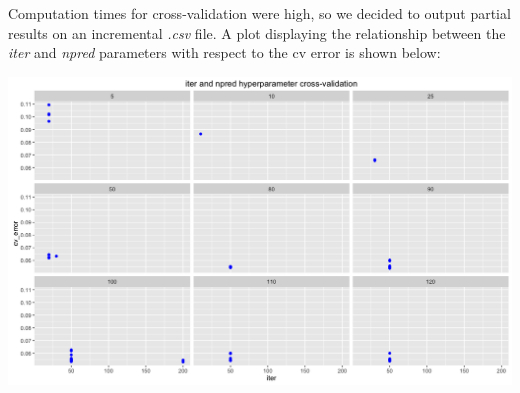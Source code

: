 Computation times for cross-validation were high, so we decided to output partial results on an incremental \textit{.csv} file. A plot displaying the relationship between the \textit{iter} and \textit{npred} parameters with respect to the cv error is shown below: 

\begin{center}
  \includegraphics[scale=0.35]{./cv.png}
\end{center}    


